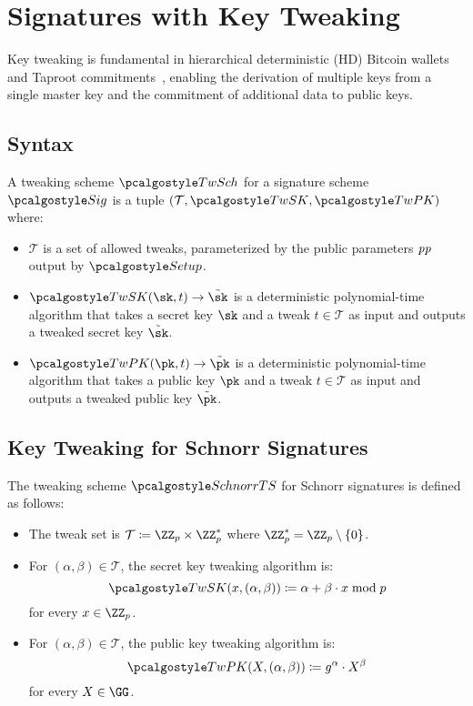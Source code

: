 \section{Signatures with Key Tweaking}\label{sec:signatures-key-tweaking}

Key tweaking is fundamental in hierarchical deterministic (HD) Bitcoin wallets~\cite{add:bip-hdwallets} and Taproot commitments~\cite{add:bip-taproot}, enabling the derivation of multiple keys from a single master key and the commitment of additional data to public keys.

\subsection{Syntax}

\begin{definition}
  A tweaking scheme $\algo{TwSch}$ for a signature scheme $\algo{Sig}$ is a tuple $(\mathcal{T}, \algo{TwSK}, \algo{TwPK})$ where:
  \begin{itemize}
    \item $\mathcal{T}$ is a set of allowed tweaks, parameterized by the public parameters $\mathit{pp}$ output by $\algo{Setup}$.
    \item $\algo{TwSK}(\sk, t) \rightarrow \tilde{\sk}$ is a deterministic polynomial-time algorithm that takes a secret key $\sk$ and a tweak $t \in \mathcal{T}$ as input and outputs a tweaked secret key $\tilde{\sk}$.
    \item $\algo{TwPK}(\pk, t) \rightarrow \tilde{\pk}$ is a deterministic polynomial-time algorithm that takes a public key $\pk$ and a tweak $t \in \mathcal{T}$ as input and outputs a tweaked public key $\tilde{\pk}$.
  \end{itemize}
\end{definition}

\subsection{Key Tweaking for Schnorr Signatures}

\begin{definition}[SchnorrTS]\label{def:schnorrts}
  The tweaking scheme $\algo{SchnorrTS}$ for Schnorr signatures is defined as follows:
  \begin{itemize}
    \item The tweak set is $\mathcal{T} \defeq \ZZ_p \times \ZZ_p^*$ where $\ZZ_p^* = \ZZ_p \setminus \{0\}$.
    \item For $(\alpha, \beta) \in \mathcal{T}$, the secret key tweaking algorithm is:
    \[
      \algo{TwSK}(x, (\alpha, \beta)) \defeq \alpha + \beta \cdot x \bmod p
    \]
    for every $x \in \ZZ_p$.
    \item For $(\alpha, \beta) \in \mathcal{T}$, the public key tweaking algorithm is:
    \[
      \algo{TwPK}(X, (\alpha, \beta)) \defeq g^\alpha \cdot X^\beta
    \]
    for every $X \in \GG$.
  \end{itemize}
\end{definition}

